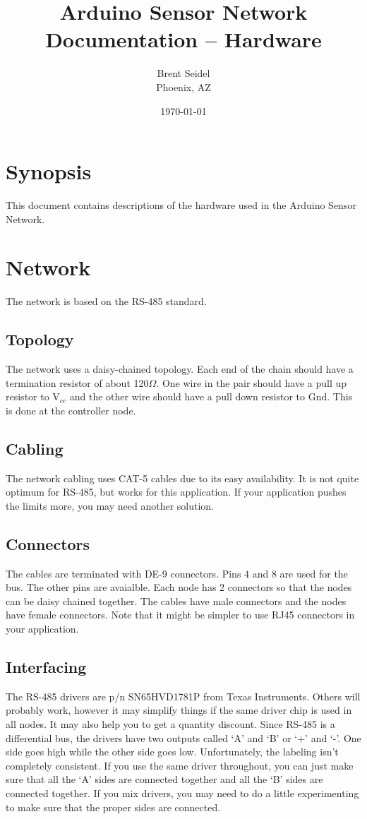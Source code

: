 \documentclass[10pt]{article}
\title{Arduino Sensor Network Documentation -- Hardware}
\author{Brent Seidel \\ Phoenix, AZ}
\date{ \today }
\begin{document}
\maketitle

\section{Synopsis}
This document contains descriptions of the hardware used in the Arduino Sensor Network.

\section{Network}
The network is based on the RS-485 standard.

\subsection{Topology}
The network uses a daisy-chained topology.  Each end of the chain should have a termination resistor of about 120$\Omega$.  One wire in the pair should have a pull up resistor to V$_{cc}$ and the other wire should have a pull down resistor to Gnd.  This is done at the controller node.

\subsection{Cabling}
The network cabling uses CAT-5 cables due to its easy availability.  It is not quite optimum for RS-485, but works for this application.  If your application pushes the limits more, you may need another solution.

\subsection{Connectors}
The cables are terminated with DE-9 connectors.  Pins 4 and 8 are used for the bus.  The other pins are avaialble.  Each node has 2 connectors so that the nodes can be daisy chained together.  The cables have male connectors and the nodes have female connectors.  Note that it might be simpler to use RJ45 connectors in your application.

\subsection{Interfacing}
The RS-485 drivers are p/n SN65HVD1781P from Texas Instruments.  Others will probably work, however it may simplify things if the same driver chip is used in all nodes.  It may also help you to get a quantity discount.  Since RS-485 is a differential bus, the drivers have two outputs called `A' and `B' or `+' and `-'.  One side goes high while the other side goes low.  Unfortunately, the labeling isn't completely consistent.  If you use the same driver throughout, you can just make sure that all the `A' sides are connected together and all the `B' sides are connected together.  If you mix drivers, you may need to do a little experimenting to make sure that the proper sides are connected.
\end{document}
